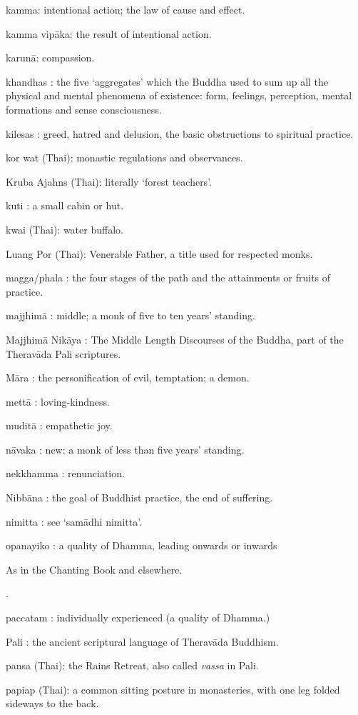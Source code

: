 kamma: intentional action; the law of cause and effect.

kamma vipāka: the result of intentional action.

karunā: compassion.

khandhas : the five `aggregates' which the Buddha used to sum up all the
physical and mental phenomena of existence: form, feelings, perception,
mental formations and sense consciousness.

kilesas : greed, hatred and delusion, the basic obstructions to
spiritual practice.

kor wat (Thai): monastic regulations and observances.

Kruba Ajahns‎‎ (Thai): literally `forest teachers'.

kuti : a small cabin or hut.

kwai (Thai): water buffalo.

Luang Por (Thai): Venerable Father, a title used for respected monks.

magga/phala : the four stages of the path and the attainments or fruits
of practice.

majjhimā : middle; a monk of five to ten years' standing.

Majjhimā Nikāya : The Middle Length Discourses of the Buddha, part of
the Theravāda‎ Pali scriptures.

Māra : the personification of evil, temptation; a demon.

mettā : loving-kindness.

muditā : empathetic joy.

nāvaka : new: a monk of less than five years' standing.

nekkhamma : renunciation.

Nibbāna : the goal of Buddhist practice, the end of suffering.

nimitta : see `samādhi nimitta'.

opanayiko : a quality of Dhamma, leading onwards or inwards

As in the Chanting Book and elsewhere.

.

paccatam : individually experienced (a quality of Dhamma.)

Pali : the ancient scriptural language of Theravāda‎ Buddhism.

pansa (Thai): the Rains Retreat, also called \emph{vassa} in Pali.

papiap (Thai): a common sitting posture in monasteries, with one leg
folded sideways to the back.

